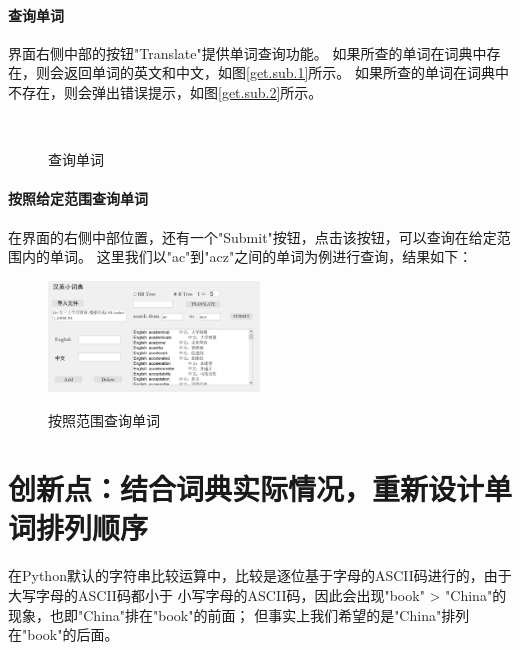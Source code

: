 \documentclass{article}
\begin{document}
\paragraph{查询单词} 界面右侧中部的按钮"Translate"提供单词查询功能。
如果所查的单词在词典中存在，则会返回单词的英文和中文，如图\ref{get.sub.1}所示。
如果所查的单词在词典中不存在，则会弹出错误提示，如图\ref{get.sub.2}所示。

\begin{figure}[H]
    \centering
    \,    
	\caption{查询单词}
	\label{get.main}
\end{figure}

\paragraph{按照给定范围查询单词}
在界面的右侧中部位置，还有一个"Submit"按钮，点击该按钮，可以查询在给定范围内的单词。
这里我们以"ac"到"acz"之间的单词为例进行查询，结果如下：
\begin{figure}[H]
	\centering
	{\includegraphics[width=0.5\textwidth]{GUI//范围查询.png}} 
	\caption{按照范围查询单词}
\end{figure}



\section{创新点：结合词典实际情况，重新设计单词排列顺序}
在Python默认的字符串比较运算中，比较是逐位基于字母的ASCII码进行的，由于大写字母的ASCII码都小于
小写字母的ASCII码，因此会出现"book" > "China"的现象，也即"China"排在"book"的前面；
但事实上我们希望的是"China"排列在"book"的后面。
\end{document}
